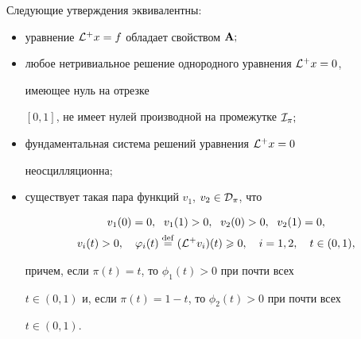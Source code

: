 \begin{thm}


\label{th4}


Следующие утверждения эквивалентны$:$


\begin{itemize}


\item[а)] уравнение ${\cal L}^+x=f$ обладает свойством $\bold A;$


\item[б)] любое нетривиальное решение однородного уравнения ${\cal L}^+x=0$,


имеющее нуль на отрезке


$[0,1]$, не имеет нулей производной на промежутке ${\cal I}_\pi;$


\item[в)] фундаментальная система решений уравнения ${\cal L}^+x=0$


неосцилляционна$;$


\item[г)] существует такая пара функций $v_1$, $v_2\in{\cal D}_\pi$, что


\begin{gather*}


v_1(0)=0,\ \; v_1(1)>0,\ \; v_2(0)>0,\ \; v_2(1)=0, \\


v_i(t)>0,\quad \phi_i(t)\df(\L^+ v_i)(t)\ge 0,\quad i=1,2,\quad


t\in(0,1),


\end{gather*}


причем, если $\pi(t)=t$, то $\phi_1(t)>0$ при почти всех


$t\in(0,1)$ и, если $\pi(t)=1-t$, то $\phi_2(t)>0$ при почти всех


$t\in(0,1)$.


\end{itemize}


\end{thm}





